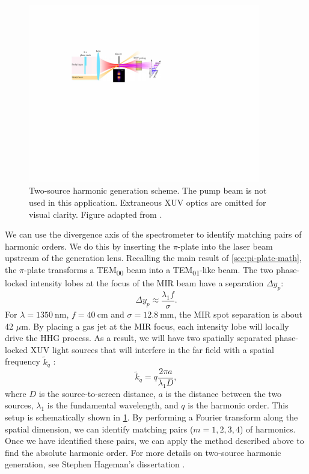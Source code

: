 \begin{figure}
	\centering
	\includegraphics[width=0.9\textwidth]{figures/chap2/two_source_HHG.pdf}
	\caption{Two-source harmonic generation scheme. The pump beam is not used in this application. Extraneous XUV optics are omitted for visual clarity. Figure adapted from \cite{camperTransverseElectromagneticMode2015}.}
	\label{fig:two-source-cartoon}
\end{figure}

We can use the divergence axis of the spectrometer to identify matching pairs of harmonic orders. We do this by inserting the $\pi$-plate into the laser beam upstream of the generation lens. Recalling the main result of \cref{sec:pi-plate-math}, the $\pi$-plate transforms a TEM\textsubscript{00} beam into a TEM\textsubscript{01}-like beam. The two phase-locked intensity lobes at the focus of the MIR beam have a separation $\Delta y_p$:
$$
\Delta y_p \approx \frac{\lambda_1 f}{\sigma}.
$$
For $\lambda = 1350 \ \textrm{nm}$, $f=40 \ \textrm{cm}$ and $\sigma = 12.8 \ \textrm{mm}$, the MIR spot separation is about {42 $\mu$m}. By placing a gas jet at the MIR focus, each intensity lobe will locally drive the HHG process. As a result, we will have two spatially separated phase-locked XUV light sources that will interfere in the far field with a spatial frequency $\tilde{k}_q$  \cite{camperTransverseElectromagneticMode2015}:
\begin{equation}
\tilde{k}_q = q \frac{2 \pi a}{\lambda_1 D},
\end{equation}
where $D$ is the source-to-screen distance, $a$ is the distance between the two sources, $\lambda_1$ is the fundamental wavelength, and $q$ is the harmonic order. This setup is schematically shown in \cref{fig:two-source-cartoon}. By performing a Fourier transform along the spatial dimension, we can identify matching pairs ($m=1,2,3,4$) of harmonics. Once we have identified these pairs, we can apply the method described above to find the absolute harmonic order. For more details on two-source harmonic generation, see Stephen Hageman's dissertation \cite{hagemanComplexAttosecondTransient2020}.

